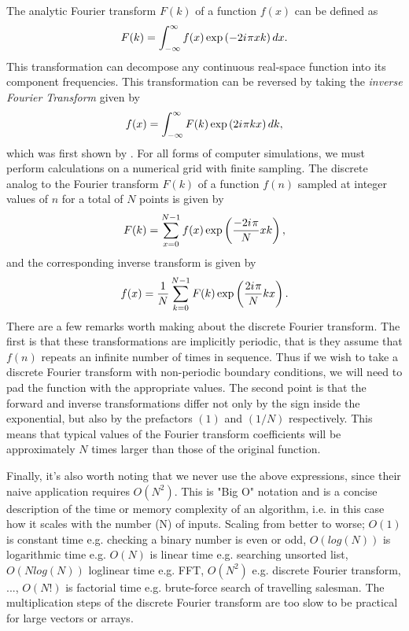 \documentclass[%
 superscriptaddress,
 aip,
 amsmath,amssymb,
preprint,%
 author-year,%
longbibliography
]{revtex4-2}
\newcommand{\ii}{{i\mkern1mu}}
\begin{document}
The analytic Fourier transform $F(k)$ of a function $f(x)$ can be defined as
\begin{equation}
    F(k)
    =
    \int_{-\infty}^\infty
    f(x)
    \exp\left(
        -2 \ii \pi x k
    \right) dx.
\end{equation}
This transformation can decompose any continuous real-space function into its component frequencies. This transformation can be reversed by taking the \emph{inverse Fourier Transform} given by
\begin{equation}
    f(x)
    =
    \int_{-\infty}^\infty
    F(k)
    \exp\left(
        2 \ii \pi k x
    \right) dk,
\end{equation}
which was first shown by \cite{baron1878analytical}. For all forms of computer simulations, we must perform calculations on a numerical grid with finite sampling. The discrete analog to the Fourier transform $F(k)$ of a function $f(n)$ sampled at integer values of $n$ for a total of $N$ points is given by
\begin{equation}
    F(k)
    =
    \sum_{x=0}^{N-1}
    f(x)
    \exp\left(
        \frac{-2 \ii \pi}{N} x k
    \right),
\end{equation}
and the corresponding inverse transform is given by
\begin{equation}
    f(x)
    =
    \frac{1}{N} \sum_{k=0}^{N-1}
    F(k)
    \exp\left(
        \frac{2 \ii \pi}{N} k x
    \right).
\end{equation}
There are a few remarks worth making about the discrete Fourier transform. The first is that these transformations are implicitly periodic, that is they assume that $f(n)$ repeats an infinite number of times in sequence. Thus if we wish to take a discrete Fourier transform with non-periodic boundary conditions, we will need to pad the function with the appropriate values. The second point is that the forward and inverse transformations differ not only by the sign inside the exponential, but also by the prefactors $(1)$ and $(1/N)$ respectively. This means that typical values of the Fourier transform coefficients will be approximately $N$ times larger than those of the original function. 

Finally, it's also worth noting that we never use the above expressions, since their naive application requires $O(N^2)$. This is "Big O" notation and is a concise description of the time or memory complexity of an algorithm, i.e. in this case how it scales with the number (N) of inputs. Scaling from better to worse; $O(1)$ is constant time e.g. checking a binary number is even or odd,  $O(log(N))$ is logarithmic time e.g. $O(N)$ is linear time e.g. searching unsorted list, $O(Nlog(N))$ loglinear time e.g. FFT, $O(N^2)$ e.g. discrete Fourier transform, ...,  $O(N!)$ is factorial time e.g. brute-force search of travelling salesman. The  multiplication steps of the discrete Fourier transform are too slow to be practical for large vectors or arrays.
\end{document}
